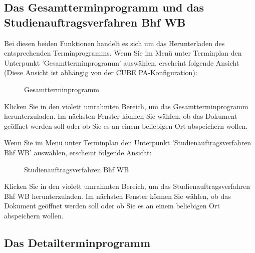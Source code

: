 \vspace{5cm} 

\subsection{Das Gesamtterminprogramm und das Studienauftragsverfahren Bhf WB}

Bei diesen beiden Funktionen handelt es sich um das Herunterladen des entsprechenden Terminprogramms.\newline
Wenn Sie im Menü unter Terminplan den Unterpunkt 'Gesamtterminprogramm' auswählen, erscheint folgende Ansicht (Diese Ansicht ist abhängig von der CUBE PA-Konfiguration):
\begin{figure}[H]
\caption{Gesamtterminprogramm}
\end{figure}

Klicken Sie in den violett umrahmten Bereich, um das Gesamtterminprogramm herunterzuladen. Im nächsten Fenster können Sie wählen, ob das Dokument geöffnet werden soll oder ob Sie es an einem beliebigen Ort abspeichern wollen.

\vspace{\baselineskip}

Wenn Sie im Menü unter Terminplan den Unterpunkt 'Studienauftragsverfahren Bhf WB' auswählen, erscheint folgende Ansicht:

\begin{figure}[H]
\caption{Studienauftragsverfahren Bhf WB}
\end{figure}

Klicken Sie in den violett umrahmten Bereich, um das Studienauftragsverfahren Bhf WB herunterzuladen. Im nächsten Fenster können Sie wählen, ob das Dokument geöffnet werden soll oder ob Sie es an einem beliebigen Ort abspeichern wollen.

\subsection{Das Detailterminprogramm}


